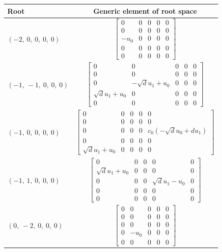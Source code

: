 \documentclass[11pt]{article}
\theoremstyle{definition}
\begin{document}
\bigskip

\noindent \begin{longtable}{|l|c|}
    \hline
    \textbf{Root} & \textbf{Generic element of root space} \\
    \hline
    \endhead
    $\left( -2, \  0, \  0, \  0, \  0\right)$ & ${\left[\begin{matrix}0 & 0 & 0 & 0 & 0\\0 & 0 & 0 & 0 & 0\\- u_{0} & 0 & 0 & 0 & 0\\0 & 0 & 0 & 0 & 0\\0 & 0 & 0 & 0 & 0\end{matrix}\right]}$ \\
    \hline
    $\left( -1, \  -1, \  0, \  0, \  0\right)$ & ${\left[\begin{matrix}0 & 0 & 0 & 0 & 0\\0 & 0 & 0 & 0 & 0\\0 & - \sqrt{d} u_{1} + u_{0} & 0 & 0 & 0\\\sqrt{d} u_{1} + u_{0} & 0 & 0 & 0 & 0\\0 & 0 & 0 & 0 & 0\end{matrix}\right]}$ \\
    \hline
    $\left( -1, \  0, \  0, \  0, \  0\right)$ & ${\left[\begin{matrix}0 & 0 & 0 & 0 & 0\\0 & 0 & 0 & 0 & 0\\0 & 0 & 0 & 0 & c_{0} \left(- \sqrt{d} u_{0} + d u_{1}\right)\\0 & 0 & 0 & 0 & 0\\\sqrt{d} u_{1} + u_{0} & 0 & 0 & 0 & 0\end{matrix}\right]}$ \\
    \hline
    $\left( -1, \  1, \  0, \  0, \  0\right)$ & ${\left[\begin{matrix}0 & 0 & 0 & 0 & 0\\\sqrt{d} u_{1} + u_{0} & 0 & 0 & 0 & 0\\0 & 0 & 0 & \sqrt{d} u_{1} - u_{0} & 0\\0 & 0 & 0 & 0 & 0\\0 & 0 & 0 & 0 & 0\end{matrix}\right]}$ \\
    \hline
    $\left( 0, \  -2, \  0, \  0, \  0\right)$ & ${\left[\begin{matrix}0 & 0 & 0 & 0 & 0\\0 & 0 & 0 & 0 & 0\\0 & 0 & 0 & 0 & 0\\0 & - u_{0} & 0 & 0 & 0\\0 & 0 & 0 & 0 & 0\end{matrix}\right]}$ \\

\end{longtable}
\end{document}
